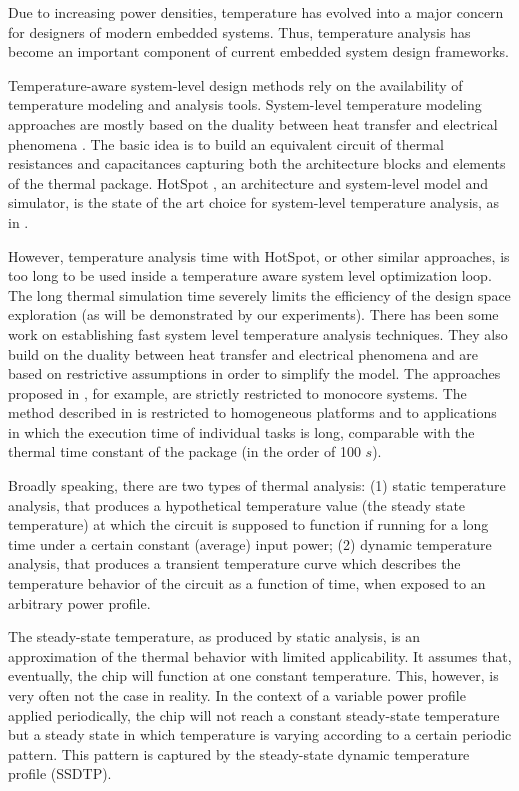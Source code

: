 Due to increasing power densities, temperature has evolved into a major concern for designers of modern embedded systems. Thus, temperature analysis has become an important component of current embedded system design frameworks.

Temperature-aware system-level design methods rely on the availability of temperature modeling and analysis tools. System-level temperature modeling approaches are mostly based on the duality between heat transfer and electrical phenomena \cite{kreith2000}. The basic idea is to build an equivalent circuit of thermal resistances and capacitances capturing both the architecture blocks and elements of the thermal package. HotSpot \cite{huang2003}, an architecture and system-level model and simulator, is the state of the art choice for system-level temperature analysis, as in \cite{srinivasan2004, liao2005, coskun2006, liu2007, huang2009, xiang2010, thiele2011}.

However, temperature analysis time with HotSpot, or other similar approaches, is too long to be used inside a temperature aware system level optimization loop. The long thermal simulation time severely limits the efficiency of the design space exploration (as will be demonstrated by our experiments). There has been some work on establishing fast system level temperature analysis techniques. They also build on the duality between heat transfer and electrical phenomena and are based on restrictive assumptions in order to simplify the model. The approaches proposed in \cite{rai2011, bao2010}, for example, are strictly restricted to monocore systems. The method described in \cite{rao2009} is restricted to homogeneous platforms and to applications in which the execution time of individual tasks is long, comparable with the thermal time constant of the package (in the order of 100 $s$).

Broadly speaking, there are two types of thermal analysis: (1) static temperature analysis, that produces a hypothetical temperature value (the steady state temperature) at which the circuit is supposed to function if running for a long time under a certain constant (average) input power; (2) dynamic temperature analysis, that produces a transient temperature curve which describes the temperature behavior of the circuit as a function of time, when exposed to an arbitrary power profile.

The steady-state temperature, as produced by static analysis, is an approximation of the thermal behavior with limited applicability. It assumes that, eventually, the chip will function at one constant temperature.  This, however, is very often not the case in reality. In the context of a variable power profile applied periodically, the chip will not reach a constant steady-state temperature but a steady state in which temperature is varying according to a certain periodic pattern. This pattern is captured by the steady-state dynamic temperature profile (SSDTP).

